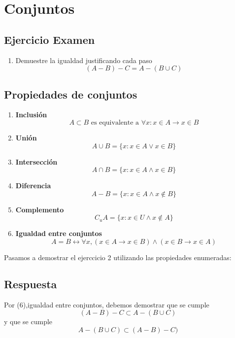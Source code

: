\section{Conjuntos}
    
        \subsection{Ejercicio Examen}
            \begin{enumerate}
                \item  Demuestre la igualdad justificando cada paso
                $$(A - B) - C = A - (B \cup C)$$        
            \end{enumerate}
            
    
        \subsection{Propiedades de conjuntos}
    
            \begin{enumerate}
                \item \textbf{Inclusión}
                    $$ A \subset B \textrm{ es equivalente a } \forall x:  x \in A \to x \in B$$
                \item \textbf{Unión}
                    $$ A \cup B = \{ x: x \in A \vee  x \in B \} $$
                \item \textbf{Intersección}
                    $$ A \cap B = \{ x: x \in A \wedge  x \in B \}  $$
                \item \textbf{Diferencia}
                    $$ A - B = \{ x: x \in A \wedge  x \notin B \} $$
                \item \textbf{Complemento}
                    $$ C_{u} A = \{ x: x \in U \wedge  x \notin A \} $$
                \item \textbf{Igualdad entre conjuntos}
                    $$ A = B  \leftrightarrow \forall x, (x \in A \to x \in B) \wedge (x \in B \to x \in A) $$
            \end{enumerate}
            
        
        Pasamos a demostrar el ejerccicio 2 utilizando las propiedades enumeradas:
        
        \subsection{Respuesta}
        
        Por (6),igualdad entre conjuntos, debemos demostrar que se cumple $$ (A - B) - C \subset A - (B \cup C) $$ y que se cumple $$A - (B \cup C) \subset (A - B) - C ) $$
            
